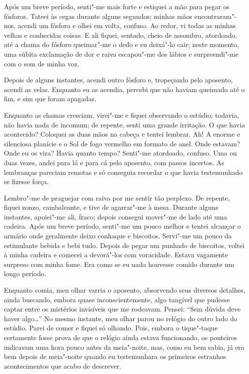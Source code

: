Após um breve período, senti"-me mais forte e estiquei a mão para pegar os fósforos. Tateei às cegas durante alguns
segundos; minhas mãos encontraram"-nos, acendi um fósforo e olhei em volta, confuso. Ao redor, vi todas as minhas velhas
e conhecidas coisas. E ali fiquei, sentado, cheio de assombro, atordoado, até a chama do fósforo queimar"-me o dedo e eu
deixá"-lo cair; neste momento, uma súbita exclamação de dor e raiva escapou"-me dos lábios e surpreendi"-me com o som de
minha voz.

Depois de alguns instantes, acendi outro fósforo e, tropeçando pelo aposento, acendi as velas. Enquanto eu as acendia,
percebi que não haviam queimado até o fim, e sim que foram apagadas.

Enquanto as chamas cresciam, virei"-me e fiquei observando o estúdio; todavia, não havia nada de incomum; de repente,
senti uma grande irritação. O que havia acontecido? Coloquei as duas mãos na cabeça e tentei lembrar. Ah! A enorme e
silenciosa planície e o Sol de fogo vermelho em formato de anel. Onde estavam? Onde eu os vira? Havia quanto tempo?
Senti"-me atordoado, confuso. Uma ou duas vezes, andei para lá e para cá pelo aposento, com passos incertos. As
lembranças pareciam remotas e só conseguia recordar o que havia testemunhado se fizesse força.

Lembro"-me de praguejar com raiva por me sentir tão perplexo. De repente, fiquei zonzo, cambaleante, e tive de
agarrar"-me à mesa. Durante alguns instantes, apoiei"-me ali, fraco; depois consegui mover"-me de lado até uma cadeira.
Após um breve período, senti"-me um pouco melhor e tentei alcançar o armário onde geralmente deixo conhaque e biscoitos.
Servi"-me um pouco da estimulante bebida e bebi tudo. Depois de pegar um punhado de biscoitos, voltei à minha cadeira e
comecei a devorá"-los com voracidade. Estava vagamente surpreso com minha fome. Era como se eu nada houvesse
comido durante um longo período.

Enquanto comia, meu olhar varria o aposento, absorvendo seus diversos detalhes, ainda buscando, embora quase
inconscientemente, algo tangível que pudesse captar entre os mistérios invisíveis que me rodeavam. Pensei: ``Sem
dúvida deve haver algo\ldots{}'' No mesmo instante, meu olhar parou no relógio do outro lado do estúdio. Parei de comer e
fiquei só olhando. Pois, embora o tique"-taque certamente fosse prova de que o relógio ainda estava funcionando, os
ponteiros indicavam uma hora pouco antes da meia"-noite, mas, como eu bem sabia, já era bem depois de meia"-noite quando
eu testemunhara os primeiros estranhos acontecimentos que acabo de descrever.

